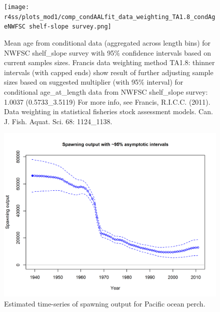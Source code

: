 \documentclass[12pt,]{article}
\begin{document}
\begin{figure}
\centering
\texttt{[image: r4ss/plots\_mod1/comp\_condAALfit\_data\_weighting\_TA1.8\_condAgeNWFSC shelf-slope survey.png]}
\caption{Mean age from conditional data (aggregated across length bins)
for NWFSC shelf\_slope survey with 95\% confidence intervals based on
current samples sizes. Francis data weighting method TA1.8: thinner
intervals (with capped ends) show result of further adjusting sample
sizes based on suggested multiplier (with 95\% interval) for conditional
age\_at\_length data from NWFSC shelf\_slope survey: 1.0037
(0.5733\_3.5119) For more info, see Francis, R.I.C.C. (2011). Data
weighting in statistical fisheries stock assessment models. Can. J.
Fish. Aquat. Sci. 68: 1124\_1138. \label{fig:weighting_nwfsccombo}}
\end{figure}

\FloatBarrier

\begin{figure}
\centering
\includegraphics{r4ss/plots_mod1/ts7_Spawning_output_with_95_asymptotic_intervals_intervals.png}
\caption{Estimated time-series of spawning output for Pacific ocean
perch. \label{fig:ssb}}
\end{figure}

\FloatBarrier
\end{document}
